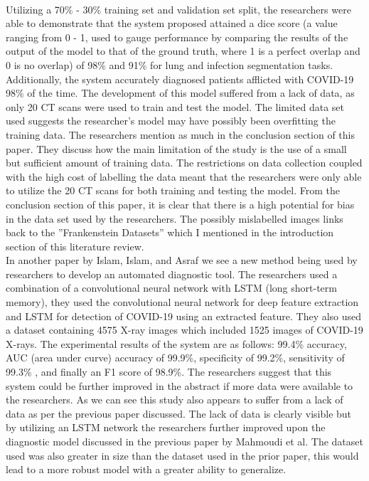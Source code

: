\\
Utilizing a 70\% - 30\% training set and validation set split, the researchers were able to demonstrate that the system proposed attained a dice score (a value ranging from 0 - 1, used to gauge performance by comparing the results of the output of the model to that of the ground truth, where 1 is a perfect overlap and 0 is no overlap) of 98\% and 91\% for lung and infection segmentation tasks.  Additionally, the system accurately diagnosed patients afflicted with COVID-19 98\% of the time.  The development of this model suffered from a lack of data, as only 20 CT scans were used to train and test the model. The limited data set used suggests the researcher's model may have possibly been overfitting the training data.  The researchers mention as much in the conclusion section of this paper. They discuss how the main limitation of the study is the use of a small but sufficient amount of training data.  The restrictions on data collection coupled with the high cost of labelling the data meant that the researchers were only able to utilize the 20 CT scans for both training and testing the model. From the conclusion section of this paper, it is clear that there is a high potential for bias in the data set used by the researchers.  The possibly mislabelled images links back to the ''Frankenstein Datasets'' which I mentioned in the introduction section of this literature review.
\\
In another paper by Islam, Islam, and Asraf\cite{litReviewCnnLstm} we see a new method being used by researchers to develop an automated diagnostic tool.  The researchers used a combination of a convolutional neural network with LSTM (long short-term memory), they used the convolutional neural network for deep feature extraction and LSTM for detection of COVID-19 using an extracted feature.  They also used a dataset containing 4575 X-ray images which included 1525 images of COVID-19 X-rays.  The experimental results of the system are as follows: 99.4\% accuracy, AUC (area under curve) accuracy of 99.9\%, specificity of 99.2\%, sensitivity of 99.3\% , and finally an F1 score of 98.9\%.  The researchers suggest that this system could be further improved in the abstract if more data were available to the researchers.  As we can see this study also appears to suffer from a lack of data as per the previous paper discussed.  The lack of data is clearly visible but by utilizing an LSTM network the researchers further improved upon the diagnostic model discussed in the previous paper by Mahmoudi et al.  The dataset used was also greater in size than the dataset used in the prior paper, this would lead to a more robust model with a greater ability to generalize.

